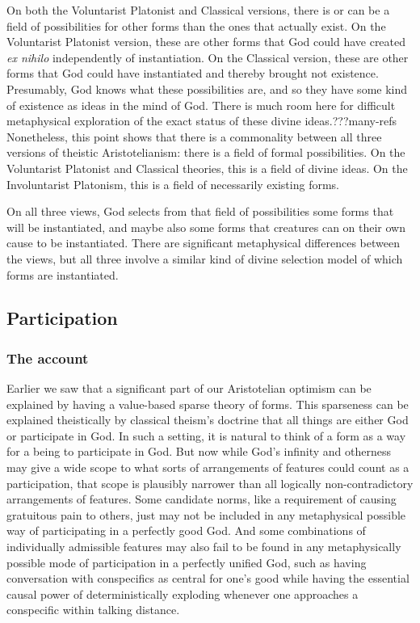 On both the Voluntarist Platonist and Classical versions, there is or can be a field of possibilities for other forms than 
the ones that actually exist. On the Voluntarist Platonist version, these are other forms that God could have created
\textit{ex nihilo} independently of instantiation.  On the Classical version, these are other forms that God could have 
instantiated and thereby brought not existence. Presumably, God knows what these possibilities are, and so they have some 
kind of existence as ideas in the mind of God. There is much room here for difficult metaphysical exploration of the 
exact status of these divine ideas.???many-refs Nonetheless, this point shows that there is a commonality between all three
versions of theistic Aristotelianism: there is a field of formal possibilities. On the Voluntarist Platonist and Classical
theories, this is a field of divine ideas. On the Involuntarist Platonism, this is a field of necessarily existing forms.

On all three views, God selects from that field of possibilities some forms that will be instantiated, and maybe also some 
forms that creatures can on their own cause to be instantiated. There are significant metaphysical differences between the
views, but all three involve a similar kind of divine selection model of which forms are instantiated.

\subsection{Participation}
\subsubsection{The account}
Earlier we saw that a significant part of our Aristotelian optimism can be explained by having a value-based sparse
theory of forms. This sparseness can be explained theistically by classical theism's doctrine 
that all things are either God or participate in God. In such a setting, it is natural to think of a form as a way for 
a being to participate in God. But now while God's infinity and otherness may give a wide scope to what sorts of
arrangements of features could count as a participation, that scope is plausibly narrower than all logically non-contradictory
arrangements of features. Some candidate norms, like a requirement of causing gratuitous pain to others, just may not be included 
in any metaphysical possible way of participating in a perfectly good God. And some combinations of individually admissible features may also 
fail to be found in any metaphysically possible mode of participation in a perfectly unified God, such as having conversation with 
conspecifics as central for one's good while having the essential causal power of deterministically exploding whenever one approaches a 
conspecific within talking distance. 

